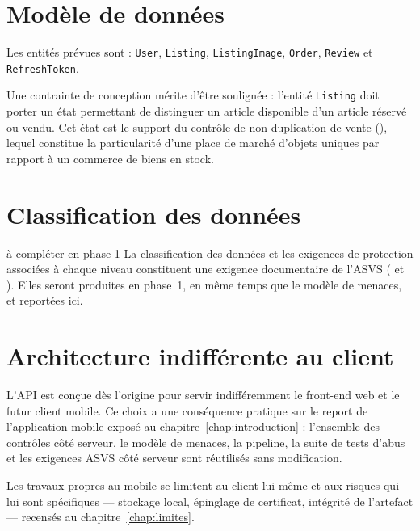 \section{Modèle de données}

Les entités prévues sont : \texttt{User}, \texttt{Listing},
\texttt{ListingImage}, \texttt{Order}, \texttt{Review} et
\texttt{RefreshToken}.

Une contrainte de conception mérite d'être soulignée : l'entité
\texttt{Listing} doit porter un état permettant de distinguer un article
disponible d'un article réservé ou vendu. Cet état est le support du contrôle de
non-duplication de vente (), lequel constitue la particularité
d'une place de marché d'objets uniques par rapport à un commerce de biens en
stock.

\section{Classification des données}

\begin{constat}{à compléter en phase 1}
La classification des données et les exigences de protection associées à chaque
niveau constituent une exigence documentaire de l'ASVS ( et
). Elles seront produites en phase~1, en même temps que le modèle
de menaces, et reportées ici.
\end{constat}

\section{Architecture indifférente au client}

L'API est conçue dès l'origine pour servir indifféremment le front-end web et
le futur client mobile. Ce choix a une conséquence pratique sur le report de
l'application mobile exposé au chapitre~\ref{chap:introduction} : l'ensemble des
contrôles côté serveur, le modèle de menaces, la pipeline, la suite de tests
d'abus et les exigences ASVS côté serveur sont réutilisés sans modification.

Les travaux propres au mobile se limitent au client lui-même et aux risques qui
lui sont spécifiques --- stockage local, épinglage de certificat, intégrité de
l'artefact --- recensés au chapitre~\ref{chap:limites}.
